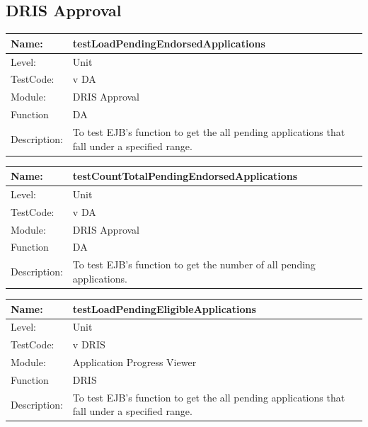 \documentclass[12pt]{article}
\begin{document}
\begin{flushleft}
\subsection{DRIS Approval}

\begin{center}
\begin{tabular}{|l|p{12cm}|}
\hline
 Name: & testLoadPendingEndorsedApplications  \\
\hline
Level: & Unit \\
\hline
TestCode: & v DA \\
\hline
Module:& DRIS Approval \\
\hline
Function & DA \\
\hline
Description: & To test EJB's function to get the all pending applications that fall under a specified range. \\
\hline
\end{tabular}
\end{center}

\begin{center}
\begin{tabular}{|l|p{12cm}|}
\hline

 Name: & testCountTotalPendingEndorsedApplications  \\
\hline
Level: & Unit \\
\hline
TestCode: & v DA \\
\hline
Module:& DRIS Approval \\
\hline
Function & DA \\
\hline
Description: & To test EJB's function to get the number of all pending applications. \\
\hline
\end{tabular}
\end{center}

\begin{center}
\begin{tabular}{|l|p{12cm}|}
\hline

 Name: & testLoadPendingEligibleApplications  \\
\hline
Level: & Unit \\
\hline
TestCode: & v DRIS \\
\hline
Module:& Application Progress Viewer \\
\hline
Function & DRIS \\
\hline
Description: & To test EJB's function to get the all pending applications that fall under a specified range. \\
\hline
\end{tabular}
\end{center}


\end{flushleft}
\end{document}
